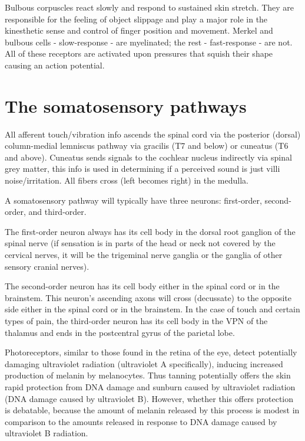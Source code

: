 \documentclass[]{book}
\begin{document}
Bulbous corpuscles react slowly and respond to sustained skin stretch. They are responsible for the feeling of object slippage and play a major role in the kinesthetic sense and control of finger position and movement. Merkel and bulbous cells - slow-response - are myelinated; the rest - fast-response - are not. All of these receptors are activated upon pressures that squish their shape causing an action potential.

\hypertarget{the-somatosensory-pathways}{%
\section{The somatosensory pathways}\label{the-somatosensory-pathways}}

All afferent touch/vibration info ascends the spinal cord via the posterior (dorsal) column-medial lemniscus pathway via gracilis (T7 and below) or cuneatus (T6 and above). Cuneatus sends signals to the cochlear nucleus indirectly via spinal grey matter, this info is used in determining if a perceived sound is just villi noise/irritation. All fibers cross (left becomes right) in the medulla.

A somatosensory pathway will typically have three neurons: first-order, second-order, and third-order.

The first-order neuron always has its cell body in the dorsal root ganglion of the spinal nerve (if sensation is in parts of the head or neck not covered by the cervical nerves, it will be the trigeminal nerve ganglia or the ganglia of other sensory cranial nerves).

The second-order neuron has its cell body either in the spinal cord or in the brainstem. This neuron's ascending axons will cross (decussate) to the opposite side either in the spinal cord or in the brainstem.
In the case of touch and certain types of pain, the third-order neuron has its cell body in the VPN of the thalamus and ends in the postcentral gyrus of the parietal lobe.

Photoreceptors, similar to those found in the retina of the eye, detect potentially damaging ultraviolet radiation (ultraviolet A specifically), inducing increased production of melanin by melanocytes. Thus tanning potentially offers the skin rapid protection from DNA damage and sunburn caused by ultraviolet radiation (DNA damage caused by ultraviolet B). However, whether this offers protection is debatable, because the amount of melanin released by this process is modest in comparison to the amounts released in response to DNA damage caused by ultraviolet B radiation.
\end{document}
